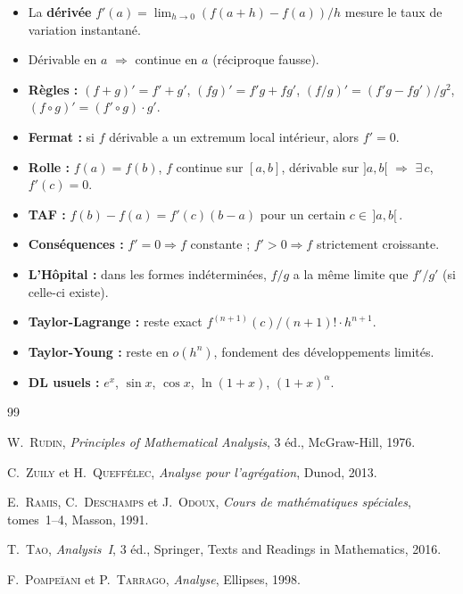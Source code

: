 \documentclass[12pt,a4paper,openany]{book}
\theoremstyle{definition}
\begin{document}
\begin{itemize}
  \item La \textbf{dérivée} $f'(a) = \lim_{h \to 0} (f(a+h) - f(a))/h$ mesure le taux de variation instantané.
  \item Dérivable en $a$ $\Rightarrow$ continue en $a$ (réciproque fausse).
  \item \textbf{Règles :} $(f+g)' = f'+g'$, $(fg)' = f'g+fg'$, $(f/g)' = (f'g-fg')/g^2$, $(f\circ g)' = (f'\circ g)\cdot g'$.
  \item \textbf{Fermat :} si $f$ dérivable a un extremum local intérieur, alors $f' = 0$.
  \item \textbf{Rolle :} $f(a) = f(b)$, $f$ continue sur $[a,b]$, dérivable sur $]a,b[$ $\Rightarrow$ $\exists\,c$, $f'(c) = 0$.
  \item \textbf{TAF :} $f(b)-f(a) = f'(c)(b-a)$ pour un certain $c \in \,]a,b[\,$.
  \item \textbf{Conséquences :} $f'=0 \Rightarrow f$ constante ; $f'>0 \Rightarrow f$ strictement croissante.
  \item \textbf{L'Hôpital :} dans les formes indéterminées, $f/g$ a la même limite que $f'/g'$ (si celle-ci existe).
  \item \textbf{Taylor-Lagrange :} reste exact $f^{(n+1)}(c)/(n+1)! \cdot h^{n+1}$.
  \item \textbf{Taylor-Young :} reste en $o(h^n)$, fondement des développements limités.
  \item \textbf{DL usuels :} $e^x$, $\sin x$, $\cos x$, $\ln(1+x)$, $(1+x)^\alpha$.
\end{itemize}

\begin{thebibliography}{99}

W.~\textsc{Rudin},
\textit{Principles of Mathematical Analysis},
3\ieme{} éd., McGraw-Hill, 1976.

C.~\textsc{Zuily} et H.~\textsc{Queffélec},
\textit{Analyse pour l'agrégation},
Dunod, 2013.

E.~\textsc{Ramis}, C.~\textsc{Deschamps} et J.~\textsc{Odoux},
\textit{Cours de mathématiques spéciales},
tomes~1--4, Masson, 1991.

T.~\textsc{Tao},
\textit{Analysis~I},
3\ieme{} éd., Springer, Texts and Readings in Mathematics, 2016.

F.~\textsc{Pompeïani} et P.~\textsc{Tarrago},
\textit{Analyse},
Ellipses, 1998.

\end{thebibliography}

\printindex
\end{document}
